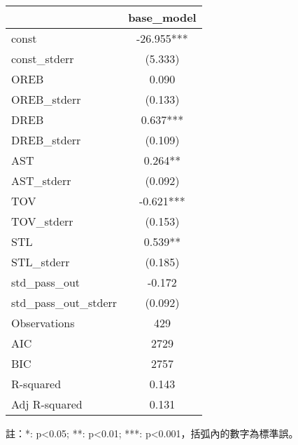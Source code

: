 \documentclass{article}
\begin{document}
    \fontsize{12pt}{14pt}\selectfont
    
    \begin{tabular}{lc}
\toprule
 & base\_model \\
\midrule
const & -26.955*** \\
const\_stderr & (5.333) \\
OREB & 0.090 \\
OREB\_stderr & (0.133) \\
DREB & 0.637*** \\
DREB\_stderr & (0.109) \\
AST & 0.264** \\
AST\_stderr & (0.092) \\
TOV & -0.621*** \\
TOV\_stderr & (0.153) \\
STL & 0.539** \\
STL\_stderr & (0.185) \\
std\_pass\_out & -0.172 \\
std\_pass\_out\_stderr & (0.092) \\
\midrule
Observations &    429 \\
AIC &    2729 \\
BIC &    2757 \\
R-squared &    0.143 \\
Adj R-squared &    0.131 \\
\bottomrule
\end{tabular}

    
    \fontsize{11pt}{14pt}\selectfont
    註：*: p<0.05; **: p<0.01; ***: p<0.001，括弧內的數字為標準誤。
    
\end{document}
